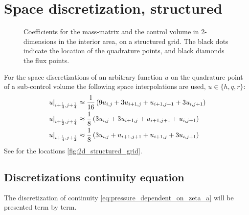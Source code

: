 \section{Space discretization, structured}
\begin{figure}[H]
    \begin{center}
        \def\svgwidth{0.80\textwidth} %
        \resizebox{0.65\textwidth}{!}{
            
        }
    \end{center}
    \caption[Definition of the grid to solve the 2D-shallow water equations in the interior area]{Coefficients for the mass-matrix and the control volume in 2-dimensions in the interior area, on a structured grid. The black dots indicate the location of the quadrature points, and black diamonds the flux points.}
    \label{fig:2d_structured_grid}
\end{figure}
For the space discretizations of an arbitrary function $u$ on the quadrature point of a sub-control volume the following space interpolations are used, $u \in \{h,q,r\}$:
\begin{align}
    \left. u\right|_{i+\frac{1}{4}, j+\frac{1}{4}} & \approx \frac{1}{16}\left( 9u_{i, j} + 3 u_{i+1,j} + u_{i+1, j+1} + 3  u_{i, j+1}\right)
    \\
    \left.u\right|_{i+\frac{1}{2}, j+\frac{1}{4}} & \approx \frac{1}{8} \left( 3 u_{i,j} + 3 u_{i+1,j} + u_{i+1, j+1} + u_{i, j+1} \right)
    \\
    \left. u \right|_{i+\frac{1}{4}, j+\frac{1}{2}} & \approx \frac{1}{8} \left( 3 u_{i, j} + u_{i+1, j+1} + u_{i+1, j}  + 3 u_{i, j+1} \right)
\end{align}
See for the locations \autoref{fig:2d_structured_grid}.
\subsection{Discretizations continuity equation}
The discretization of continuity \autoref{eq:pressure_dependent_on_zeta_a} will be presented term by term.
